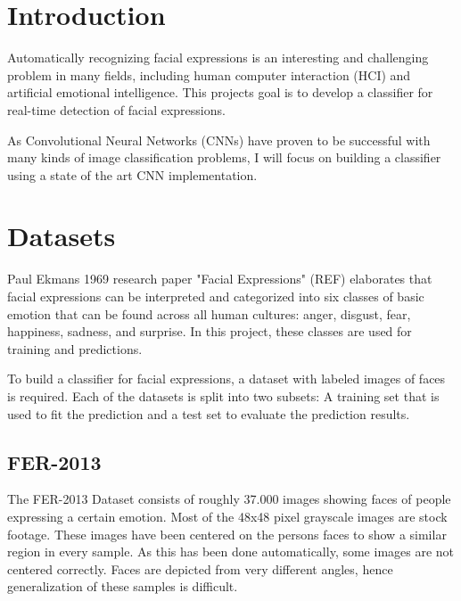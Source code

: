\documentclass[twoside]{article}
\begin{document}
\begin{multicols}{2} %

\section{Introduction}

Automatically recognizing facial expressions is an interesting and challenging problem in many fields, including human computer interaction (HCI) and artificial emotional intelligence. This projects goal is to develop a classifier for real-time detection of facial expressions. 

As Convolutional Neural Networks (CNNs) have proven to be successful with many kinds of image classification  problems, I will focus on building a classifier using a state of the art CNN implementation.


\section{Datasets}

Paul Ekmans 1969 research paper "Facial Expressions" (REF) elaborates that facial expressions can be interpreted and categorized into six classes of basic emotion that can be found across all human cultures: anger, disgust, fear, happiness, sadness, and surprise. In this project, these classes are used for training and predictions.

To build a classifier for facial expressions, a dataset with labeled images of faces is required. Each of the datasets is split into two subsets: A training set that is used to fit the prediction and a test set to evaluate the prediction results.

\subsection{FER-2013}

The FER-2013 Dataset consists of roughly 37.000 images showing faces of people expressing a certain emotion. Most of the 48x48 pixel grayscale images are stock footage. These images have been centered on the persons faces to show a similar region in every sample. As this has been done automatically, some images are not centered correctly. Faces are depicted from very different angles, hence generalization of these samples is difficult. 


\end{multicols}
\end{document}
